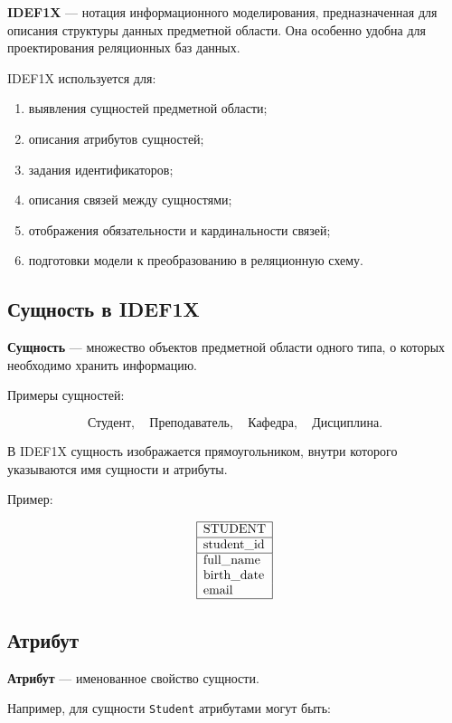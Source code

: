 \documentclass[12pt,a4paper]{article}
\theoremstyle{remark}
\begin{document}
\textbf{IDEF1X} --- нотация информационного моделирования, предназначенная для описания структуры данных предметной области. Она особенно удобна для проектирования реляционных баз данных.

IDEF1X используется для:

\begin{enumerate}
    \item выявления сущностей предметной области;
    \item описания атрибутов сущностей;
    \item задания идентификаторов;
    \item описания связей между сущностями;
    \item отображения обязательности и кардинальности связей;
    \item подготовки модели к преобразованию в реляционную схему.
\end{enumerate}

\subsection{Сущность в IDEF1X}

\textbf{Сущность} --- множество объектов предметной области одного типа, о которых необходимо хранить информацию.

Примеры сущностей:

\[
    \text{Студент}, \quad \text{Преподаватель}, \quad \text{Кафедра}, \quad \text{Дисциплина}.
\]

В IDEF1X сущность изображается прямоугольником, внутри которого указываются имя сущности и атрибуты.

Пример:

\[
\begin{array}{|l|}
\hline
\text{STUDENT}\\
\hline
\text{student\_id}\\
\hline
\text{full\_name}\\
\text{birth\_date}\\
\text{email}\\
\hline
\end{array}
\]

\subsection{Атрибут}

\textbf{Атрибут} --- именованное свойство сущности.

Например, для сущности \texttt{Student} атрибутами могут быть:
\end{document}
